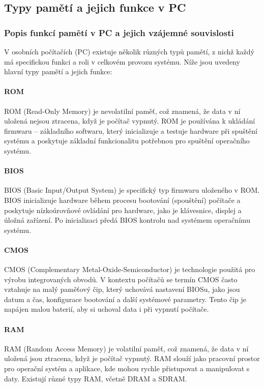 \subsection{Typy pamětí a jejich funkce v PC}

\subsubsection{Popis funkcí pamětí v PC a jejich vzájemné souvislosti}
V osobních počítačích (PC) existuje několik různých typů pamětí, z nichž každý má specifickou funkci a roli v celkovém provozu systému. Níže jsou uvedeny hlavní typy pamětí a jejich funkce:

\paragraph{ROM}
ROM (Read-Only Memory) je nevolatilní paměť, což znamená, že data v ní uložená nejsou ztracena, když je počítač vypnutý. ROM je používána k ukládání firmwaru – základního softwaru, který inicializuje a testuje hardware při spuštění systému a poskytuje základní funkcionalitu potřebnou pro spuštění operačního systému.

\paragraph{BIOS}
BIOS (Basic Input/Output System) je specifický typ firmwaru uloženého v ROM. BIOS inicializuje hardware během procesu bootování (spouštění) počítače a poskytuje nízkoúrovňové ovládání pro hardware, jako je klávesnice, displej a úložná zařízení. Po inicializaci předá BIOS kontrolu nad systémem operačnímu systému.

\paragraph{CMOS}
CMOS (Complementary Metal-Oxide-Semiconductor) je technologie použitá pro výrobu integrovaných obvodů. V kontextu počítačů se termín CMOS často vztahuje na malý paměťový čip, který uchovává nastavení BIOSu, jako jsou datum a čas, konfigurace bootování a další systémové parametry. Tento čip je napájen malou baterií, aby si uchoval data i při vypnutí počítače.

\paragraph{RAM}
RAM (Random Access Memory) je volatilní paměť, což znamená, že data v ní uložená jsou ztracena, když je počítač vypnutý. RAM slouží jako pracovní prostor pro operační systém a aplikace, kde mohou rychle přistupovat a manipulovat s daty. Existují různé typy RAM, včetně DRAM a SDRAM.

